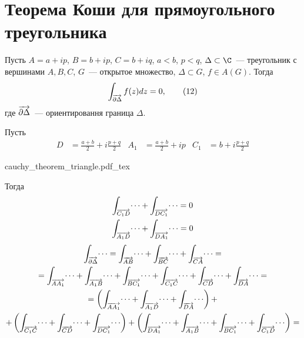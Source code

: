 \documentclass[main]{subfiles}
\begin{document}
\section{Теорема Коши для прямоугольного треугольника}
\begin{theorem}
    Пусть $A = a + ip$, $B = b + ip$, $C = b + iq$, $a < b$, $p < q$, $\Delta \subset \C$~--- треугольник с вершинами $A,B,C$, $G$~--- открытое множество, $\Delta \subset G$, $f \in A(G)$.
    Тогда
    \[\AnClOrInt[\AnClOrCurve[\partial \Delta]] f(z) dz = 0, \tag{12}\]
    где $\AnClOrCurve[\partial \Delta]$~--- ориентировання граница $\Delta$.
\end{theorem}
\begin{longProof}
    Пусть
    \begin{align*}
        D & = \frac{a + b}{2} + i \frac{p + q}{2} & A_1 & = \frac{a + b}{2} + ip & C_1 & = b + i \frac{p + q}{2}
    \end{align*}
    \begin{center}
        {cauchy_theorem_triangle.pdf_tex}
    \end{center}
    Тогда
    \begin{gather*}
        \AnClOrInt[\AnClOrCurve[C_1 D]] \dotsi + \AnClOrInt[\AnClOrCurve[D C_1]] \dotsi = 0 \\
        \AnClOrInt[\AnClOrCurve[A_1 D]] \dotsi + \AnClOrInt[\AnClOrCurve[D A_1]] \dotsi = 0
    \end{gather*}
    \begin{multline*}
        \AnClOrInt[\AnClOrCurve[\partial \Delta]] \dotsi = \AnClOrInt[\AnClOrCurve[AB]] \dotsi + \AnClOrInt[\AnClOrCurve[BC]] \dotsi + \AnClOrInt[\AnClOrCurve[CA]] \dotsi = \\
        = \AnClOrInt[\AnClOrCurve[AA_1]] \dotsi + \AnClOrInt[\AnClOrCurve[A_1 B]] \dotsi + \AnClOrInt[\AnClOrCurve[BC_1]] \dotsi + \AnClOrInt[\AnClOrCurve[C_1 C]] \dotsi + \AnClOrInt[\AnClOrCurve[CD]] \dotsi + \AnClOrInt[\AnClOrCurve[DA]] \dotsi = \\
        = \left( \AnClOrInt[\AnClOrCurve[AA_1]] \dotsi + \AnClOrInt[\AnClOrCurve[A_1 D]] \dotsi + \AnClOrInt[\AnClOrCurve[DA]] \dotsi \right) + \\
        + \left( \AnClOrInt[\AnClOrCurve[C_1 C]] \dotsi + \AnClOrInt[\AnClOrCurve[CD]] \dotsi + \AnClOrInt[\AnClOrCurve[DC_1]] \dotsi\right) + \left( \AnClOrInt[\AnClOrCurve[DA_1]] \dotsi + \AnClOrInt[\AnClOrCurve[A_1 B]] \dotsi + \AnClOrInt[\AnClOrCurve[BC_1]] \dotsi + \AnClOrInt[\AnClOrCurve[C_1 D]] \dotsi\right) = \\

\end{multline*}
\end{longProof}
\end{document}
